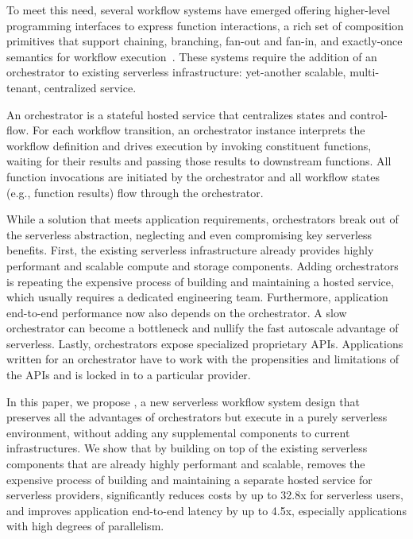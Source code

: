 To meet this need, several workflow systems have emerged offering higher-level
programming interfaces to express function interactions, a rich set of
composition primitives that support chaining, branching, fan-out and fan-in, and
exactly-once semantics for workflow execution~\cite{excamera, gg-atc,
aws-step-functions, google-cloud-composer, google-workflows, durable-functions}.
These systems require the addition of an orchestrator to existing serverless
infrastructure: yet-another scalable, multi-tenant, centralized service.

An orchestrator is a stateful hosted service that centralizes states and
control-flow. For each workflow transition, an orchestrator instance interprets
the workflow definition and drives execution by invoking constituent functions,
waiting for their results and passing those results to downstream functions. All
function invocations are initiated by the orchestrator and all workflow states
(e.g., function results) flow through the orchestrator.

While a solution that meets application requirements, orchestrators break out
of the serverless abstraction, neglecting and even compromising key serverless
benefits. First, the existing serverless infrastructure already provides
highly performant and scalable compute and storage components. Adding
orchestrators is repeating the expensive process of building and maintaining a
hosted service, which usually requires a dedicated engineering team.
Furthermore, application end-to-end performance now also depends on the
orchestrator. A slow orchestrator can become a bottleneck and nullify the fast
autoscale advantage of serverless. Lastly, orchestrators expose specialized
proprietary APIs. Applications written for an orchestrator have to work with
the propensities and limitations of the APIs and is locked in to a particular
provider. 

In this paper, we propose \name{}, a new serverless workflow system design
that preserves all the advantages of orchestrators but execute in a purely
serverless environment, without adding any supplemental components to current
infrastructures. We show that by building on top of the existing serverless
components that are already highly performant and scalable, \name{} removes
the expensive process of building and maintaining a separate hosted service
for serverless providers, significantly reduces costs by up to 32.8x for
serverless users, and improves application end-to-end latency by up to 4.5x,
especially applications with high degrees of parallelism.

